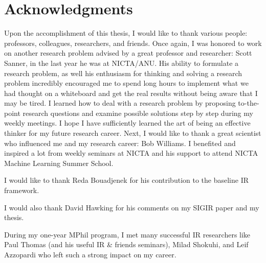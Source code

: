 \chapter*{Acknowledgments}

Upon the accomplishment of this thesis, I would like to thank various people: 
professors, colleagues, researchers, and friends. Once again, I was honored to work on another research problem advised by a great professor and researcher: Scott Sanner, in the last year he was at NICTA/ANU. His ability to formulate a research problem, as well his enthusiasm for thinking and solving a research problem incredibly encouraged me to spend long hours to implement what we had thought on a whiteboard and get the real results without being aware that I may be tired. I learned how to deal with a research problem by proposing to-the-point research questions and examine possible solutions step by step during my weekly meetings. I hope I have sufficiently learned the art of being an effective thinker for my future research career. Next, I would like to thank a great scientist who influenced me and my research career: Bob Williams. I benefited and inspired a lot from weekly seminars at NICTA and his support to attend NICTA Machine Learning Summer School.  

I would like to thank Reda Bouadjenek for his contribution to the baseline IR framework. 

I would also thank David Hawking for his comments on my SIGIR paper and my thesis.

During my one-year MPhil program, I met many successful IR researchers like Paul Thomas (and his useful IR \& friends seminars), Milad Shokuhi, and Leif Azzopardi who left such a strong impact on my career.  